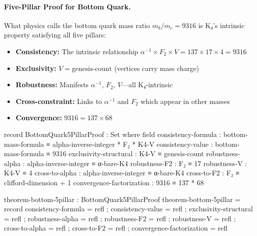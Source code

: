 \documentclass[11pt,a4paper]{book}
\begin{document}
\paragraph{Five-Pillar Proof for Bottom Quark.}
What physics calls the bottom quark mass ratio $m_b/m_e = 9316$ is K₄'s intrinsic property satisfying all five pillars:
\begin{itemize}
\item \textbf{Consistency:} The intrinsic relationship $\alpha^{-1} \times F_2 \times V = 137 \times 17 \times 4 = 9316$
\item \textbf{Exclusivity:} $V = \text{genesis-count}$ (vertices carry mass charge)
\item \textbf{Robustness:} Manifests $\alpha^{-1}$, $F_2$, $V$—all K₄-intrinsic
\item \textbf{Cross-constraint:} Links to $\alpha^{-1}$ and $F_2$ which appear in other masses
\item \textbf{Convergence:} $9316 = 137 \times 68$
\end{itemize}

\begin{code}
record BottomQuark5PillarProof : Set where
  field
    consistency-formula : bottom-mass-formula ≡ alpha-inverse-integer * F₂ * K4-V
    consistency-value : bottom-mass-formula ≡ 9316
    exclusivity-structural : K4-V ≡ genesis-count
    robustness-alpha : alpha-inverse-integer ≡ α-bare-K4
    robustness-F2 : F₂ ≡ 17
    robustness-V : K4-V ≡ 4
    cross-to-alpha : alpha-inverse-integer ≡ α-bare-K4
    cross-to-F2 : F₂ ≡ clifford-dimension + 1
    convergence-factorization : 9316 ≡ 137 * 68
    
theorem-bottom-5pillar : BottomQuark5PillarProof
theorem-bottom-5pillar = record
  { consistency-formula = refl
  ; consistency-value = refl
  ; exclusivity-structural = refl
  ; robustness-alpha = refl
  ; robustness-F2 = refl
  ; robustness-V = refl
  ; cross-to-alpha = refl
  ; cross-to-F2 = refl
  ; convergence-factorization = refl
  }
\end{code}
\end{document}
